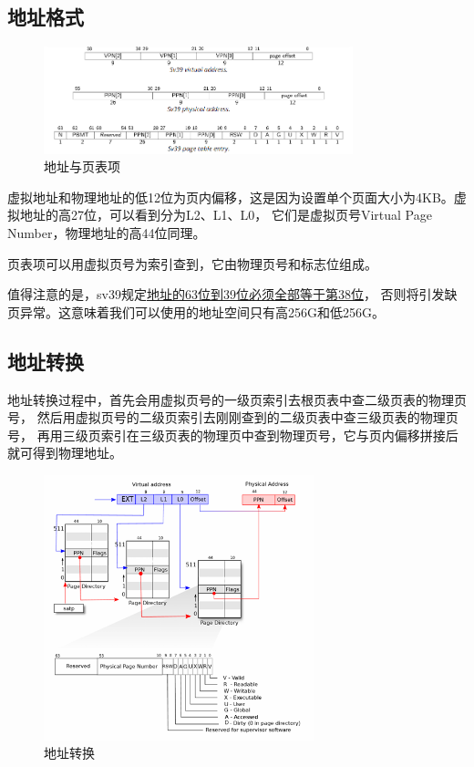 \subsection{地址格式}

\begin{figure}[htbp]
    \centering
    \includegraphics[width=0.8\textwidth]{../image/地址.png}
    \caption{地址与页表项}
    \label{fig:地址}
\end{figure}

虚拟地址和物理地址的低12位为页内偏移，这是因为设置单个页面大小为4KB。虚拟地址的高27位，可以看到分为L2、L1、L0，
它们是虚拟页号Virtual Page Number，物理地址的高44位同理。

页表项可以用虚拟页号为索引查到，它由物理页号和标志位组成。

值得注意的是，sv39规定\href{https://five-embeddev.com/riscv-priv-isa-manual/Priv-v1.12/supervisor.html#sec:sv39}{地址的63位到39位必须全部等于第38位}，
否则将引发缺页异常。这意味着我们可以使用的地址空间只有高256G和低256G。

\subsection{地址转换}

地址转换过程中，首先会用虚拟页号的一级页索引去根页表中查二级页表的物理页号，
然后用虚拟页号的二级页索引去刚刚查到的二级页表中查三级页表的物理页号，
再用三级页索引在三级页表的物理页中查到物理页号，它与页内偏移拼接后就可得到物理地址。

\begin{figure}[htbp]
    \centering
    \includegraphics[width=0.7\textwidth]{../image/地址转换.png}
    \caption{地址转换}
    \label{fig:地址转换}
\end{figure}

